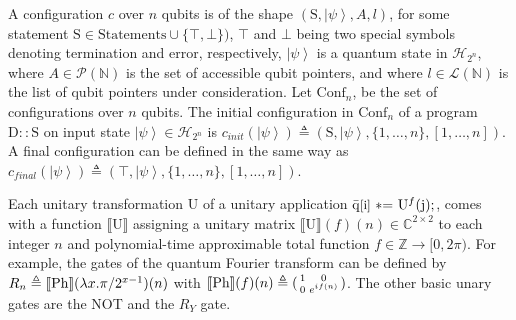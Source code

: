 A configuration $c$ over $n$ qubits is of the shape $(\mathrm{S},\left|\psi\right\rangle,A,l)$, for some statement $\mathrm{S}\in\text{Statements}\cup\{\top,\bot\})$, $\top$ and $\bot$ being two special symbols denoting termination and error, respectively, $\left|\psi\right\rangle$ is a quantum state in $\mathcal{H}_{2^{n}}$, where $A\in\mathcal{P}(\mathbb{N})$ is the set of accessible qubit pointers, and where $l\in\mathcal{L}(\mathbb{N})$ is the list of qubit pointers under consideration. Let $\text{Conf}_{n}$, be the set of configurations over $n$ qubits. The initial configuration in $\text{Conf}_{n}$ of a program $\mathrm{D}::\mathrm{S}$ on input state $\left|\psi\right\rangle\in\mathcal{H}_{2^{n}}$ is $c_{init}(\left|\psi\right\rangle)\triangleq(\mathrm{S},\left|\psi\right\rangle%
,\{1,\dots,n\},[1,\dots,n])$. A final configuration can be defined in the same way as $c_{final}(\left|\psi\right\rangle)\triangleq(\top,\left|\psi\right\rangle,\{1,%
\dots,n\},[1,\dots,n])$.\par
 
 
 
Each unitary transformation $\mathrm{U}$ of a unitary application $\bar{\mathrm{q}}\textnormal{\small[$\mathrm{i}$]}{\ \textnormal{{%
\textasteriskcentered=}}\ }\mathrm{U}^{f}(\mathrm{j});$, comes with a function $\llbracket\mathrm{U}\rrbracket$ assigning a unitary matrix $\llbracket\mathrm{U}\rrbracket(f)(n)\in\mathbb{C}^{2\times 2}$ to each integer $n$ and polynomial-time approximable total function $f\in\mathbb{Z}\to[0,2\pi)$. For example, the gates of the quantum Fourier transform can be defined by $R_{n}\triangleq\llbracket\textnormal{Ph}\rrbracket(\lambda x.\pi/2^{x-1})(n)$ with $\llbracket\textnormal{Ph}\rrbracket(f)(n)\triangleq(\begin{smallmatrix}1&0\\
0&e^{if(n)}\end{smallmatrix})$. The other basic unary gates are the NOT and the $R_{Y}$ gate.\par
 
 
 
